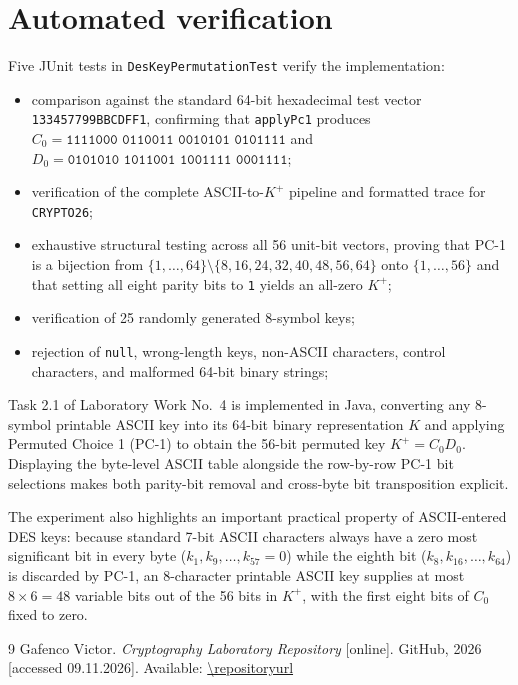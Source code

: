 \documentclass{utmreport}
\begin{document}
\section{Automated verification}
Five JUnit tests in \texttt{DesKeyPermutationTest} verify the implementation:
\begin{itemize}
\item comparison against the standard 64-bit hexadecimal test vector \texttt{133457799BBCDFF1}, confirming that \texttt{applyPc1} produces $C_0=\texttt{1111000 0110011 0010101 0101111}$ and $D_0=\texttt{0101010 1011001 1001111 0001111}$;
\item verification of the complete ASCII-to-$K^+$ pipeline and formatted trace for \texttt{CRYPTO26};
\item exhaustive structural testing across all 56 unit-bit vectors, proving that PC-1 is a bijection from $\{1,\ldots,64\}\setminus\{8,16,24,32,40,48,56,64\}$ onto $\{1,\ldots,56\}$ and that setting all eight parity bits to \texttt{1} yields an all-zero $K^+$;
\item verification of 25 randomly generated 8-symbol keys;
\item rejection of \texttt{null}, wrong-length keys, non-ASCII characters, control characters, and malformed 64-bit binary strings;
\end{itemize}

\utmconclusions
Task 2.1 of Laboratory Work No.~4 is implemented in Java, converting any 8-symbol printable ASCII key into its 64-bit binary representation $K$ and applying Permuted Choice 1 (PC-1) to obtain the 56-bit permuted key $K^+=C_0D_0$. Displaying the byte-level ASCII table alongside the row-by-row PC-1 bit selections makes both parity-bit removal and cross-byte bit transposition explicit.

The experiment also highlights an important practical property of ASCII-entered DES keys: because standard 7-bit ASCII characters always have a zero most significant bit in every byte ($k_1,k_9,\ldots,k_{57}=0$) while the eighth bit ($k_8,k_{16},\ldots,k_{64}$) is discarded by PC-1, an 8-character printable ASCII key supplies at most $8\times6=48$ variable bits out of the 56 bits in $K^+$, with the first eight bits of $C_0$ fixed to zero.

\begin{thebibliography}{9}
 Gafenco Victor. \textit{Cryptography Laboratory Repository} [online]. GitHub, 2026 [accessed 09.11.2026]. Available: \url{\repositoryurl}
\end{thebibliography}
\end{document}
